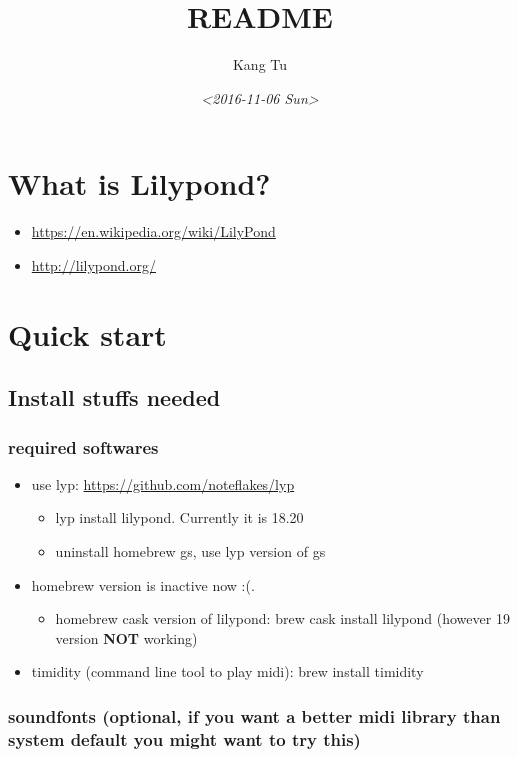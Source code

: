 \documentclass[11pt]{article}
\author{Kang Tu}
\date{\textit{<2016-11-06 Sun>}}
\title{README}
\begin{document}
\maketitle

\section{What is Lilypond?}
\label{sec:org6aec680}

\begin{itemize}
\item \url{https://en.wikipedia.org/wiki/LilyPond}
\item \url{http://lilypond.org/}
\end{itemize}

\section{Quick start}
\label{sec:org09422b3}

\subsection{Install stuffs needed}
\label{sec:org9a155a0}

\subsubsection{required softwares}
\label{sec:orgefbf4ed}

\begin{itemize}
\item use lyp: \url{https://github.com/noteflakes/lyp}
\begin{itemize}
\item lyp install lilypond. Currently it is 18.20
\item uninstall homebrew gs, use lyp version of gs
\end{itemize}
\item homebrew version is inactive now :(.
\begin{itemize}
\item homebrew cask version of lilypond: brew cask install lilypond (however 19 version \textbf{NOT} working)
\end{itemize}
\item timidity (command line tool to play midi): brew install timidity
\end{itemize}

\subsubsection{soundfonts (optional, if you want a better midi library than system default you might want to try this)}
\label{sec:org7a54830}
\end{document}
